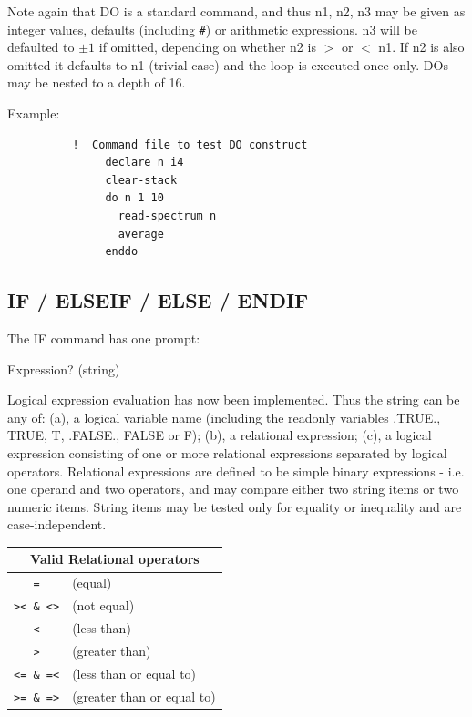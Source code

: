 \documentclass[11pt,twoside]{report}
\begin{document}
Note again that DO is a standard command, and thus n1, n2, n3 may be given as
integer values, defaults (including \verb+#+) or arithmetic expressions. n3 will be
defaulted to $\pm 1$ if omitted, depending on whether n2 is $>$ or $<$ n1. If n2 is also
omitted it defaults to n1 (trivial case) and the loop is executed once only. DOs
may be nested to a depth of 16.

Example:
\begin{verbatim}
          !  Command file to test DO construct
               declare n i4
               clear-stack
               do n 1 10
                 read-spectrum n
                 average
               enddo
\end{verbatim}


\subsection{IF / ELSEIF / ELSE / ENDIF}

The IF command has one prompt:
\begin{description}
\item{}               Expression?    (string)
\end{description}
Logical expression evaluation has now been
implemented. Thus the string can be any of: (a), a logical variable name
(including the readonly variables .TRUE., TRUE, T, .FALSE., FALSE or F); (b), a
relational expression; (c), a logical
expression consisting of one or more relational expressions separated by
logical operators. Relational expressions are defined to be simple binary
expressions - i.e. one operand and two operators, and may compare either two
string items or two numeric items. String items may be tested only for equality
or inequality and are case-independent.

\begin{center}
\begin{tabular}{|cl|} \hline
               \multicolumn{2}{|c|}{Valid Relational operators} \\ \hline
               \verb$=$          & (equal) \\
               \verb$>< & <>$    & (not equal) \\
               \verb$<$          & (less than) \\
               \verb$>$          & (greater than) \\
               \verb$<= & =<$    & (less than or equal to) \\
               \verb$>= & =>$    & (greater than or equal to) \\ \hline
\end{tabular}
\end{center}
\end{document}
